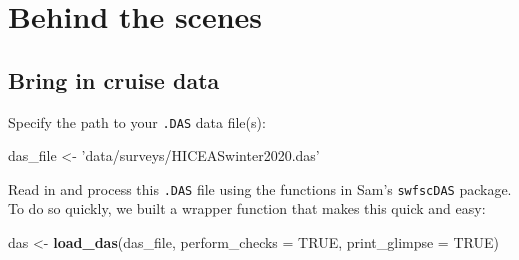 \documentclass[
]{book}
\newenvironment{Shaded}{\begin{snugshade}}{\end{snugshade}}
\newcommand{\DataTypeTok}[1]{\textcolor[rgb]{0.13,0.29,0.53}{#1}}
\newcommand{\KeywordTok}[1]{\textcolor[rgb]{0.13,0.29,0.53}{\textbf{#1}}}
\newcommand{\NormalTok}[1]{#1}
\newcommand{\OtherTok}[1]{\textcolor[rgb]{0.56,0.35,0.01}{#1}}
\newcommand{\StringTok}[1]{\textcolor[rgb]{0.31,0.60,0.02}{#1}}
\begin{document}
\hypertarget{behind-the-scenes}{%
\section*{Behind the scenes}\label{behind-the-scenes}}

\hypertarget{bring-in-cruise-data}{%
\subsection*{Bring in cruise data}\label{bring-in-cruise-data}}

Specify the path to your \texttt{.DAS} data file(s):

\begin{Shaded}
\begin{Highlighting}[]
\NormalTok{das_file <-}\StringTok{ 'data/surveys/HICEASwinter2020.das'}
\end{Highlighting}
\end{Shaded}

Read in and process this \texttt{.DAS} file using the functions in Sam's \texttt{swfscDAS} package. To do so quickly, we built a wrapper function that makes this quick and easy:

\begin{Shaded}
\begin{Highlighting}[]
\NormalTok{das <-}\StringTok{ }\KeywordTok{load_das}\NormalTok{(das_file, }
                \DataTypeTok{perform_checks =} \OtherTok{TRUE}\NormalTok{,}
                \DataTypeTok{print_glimpse =} \OtherTok{TRUE}\NormalTok{)}
\end{Highlighting}
\end{Shaded}
\end{document}
